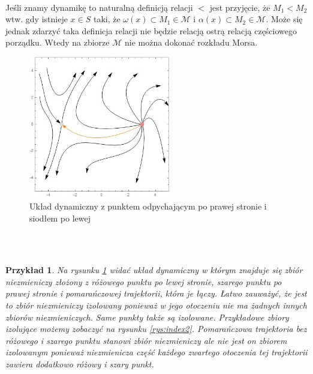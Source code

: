 \documentclass[12pt,a4paper]{article}
\newtheorem{example}{Przykład}[section]
\begin{document}
\\ Jeśli znamy dynamikę to naturalną definicją relacji $<$ jest przyjęcie, że $M_1<M_2$ wtw. gdy istnieje $x\in S$ taki, że $\omega(x)\subset M_1\in \mathcal{M}$ i $\alpha(x)\subset M_2\in\mathcal{M}$. Może się jednak zdarzyć taka definicja relacji nie będzie relacją ostrą relacją częściowego porządku. Wtedy na zbiorze $\mathcal{M}$ nie można dokonać rozkładu Morsa.
\\
\begin{figure}[H]
    \centering
   \includegraphics[width=0.55\textwidth]
   {IndexConley'a1.jpg}
    \caption{Układ dynamiczny z punktem odpychającym po prawej stronie i siodłem po lewej}
    \label{rys:index1}
   
\end{figure}
\\
\\
\begin{example}
Na rysunku \ref{rys:index1} widać układ dynamiczny w którym znajduje się zbiór niezmieniczy złożony z różowego punktu po lewej stronie, szarego punktu po prawej stronie i pomarańczowej trajektorii, która je łączy. Łatwo zauważyć, że jest to zbiór niezmieniczy izolowany ponieważ w jego otoczeniu nie ma żadnych innych zbiorów niezmieniczych. Same punkty także są izolowane. Przykładowe zbiory izolujące możemy zobaczyć na rysunku \ref{rys:index2}. Pomarańczowa trajektoria bez różowego i szarego punktu stanowi zbiór niezmieniczy ale nie jest on zbiorem izolowanym ponieważ niezmienicza część każdego zwartego otoczenia tej trajektorii zawiera dodatkowo różowy i szary punkt. 
\end{example}
\\
\\
\end{document}
